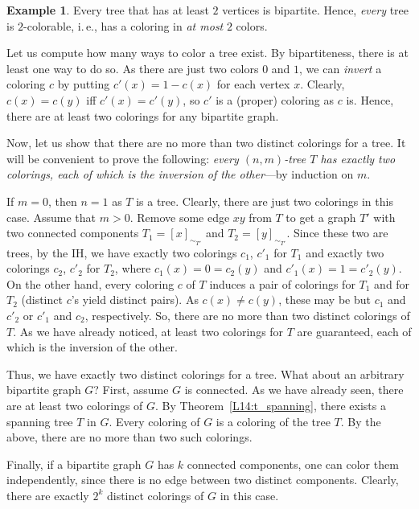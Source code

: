 \documentclass[12pt,notitlepage]{article}
\theoremstyle{plain}
\theoremstyle{definition}
\newtheorem{exm}[thm]{Example}
\theoremstyle{plain}
\newcommand{\1}{\mathbf{1}}
\newcommand{\0}{\mathbf{0}}
\begin{document}
\begin{exm}
Every tree that has at least $2$ vertices is bipartite. Hence, \emph{every} tree is $2$-colorable, i.\,e., has a coloring in \emph{at most} $2$ colors.

Let us compute how many ways to color a tree exist. By bipartiteness, there is at least one way to do so. As there are just two colors $0$ and $1$, we can \emph{invert} a coloring $c$ by putting $c'(x) = 1 - c(x)$ for each vertex $x$. Clearly, $c(x) = c(y)$ iff $c'(x) = c'(y)$, so $c'$ is a (proper) coloring as $c$ is. Hence, there are at least two colorings for any bipartite graph.

Now, let us show that there are no more than two distinct colorings for a tree. It will be convenient to prove the following: \emph{every $(n,m)$-tree $T$ has exactly two colorings, each of which is the inversion of the other}---by induction on $m$.

If $m = 0$, then $n = 1$ as $T$ is a tree. Clearly, there are just two colorings in this case. Assume that $m > 0$. Remove some edge $x y$ from $T$ to get a graph $T'$ with two connected components $T_1 = [x]_{\sim_{T'}}$ and $T_2 = [y]_{\sim_{T'}}$. Since these two are trees, by the IH, we have exactly two colorings $c_1$, $c'_1$ for $T_1$ and exactly two colorings $c_2$, $c'_2$ for $T_2$, where $c_1(x) = 0 = c_2(y)$ and $c'_1(x) = 1 = c'_2(y)$. On the other hand, every coloring $c$ of $T$ induces a pair of colorings for $T_1$ and for $T_2$ (distinct $c$'s yield distinct pairs). As $c(x) \neq c(y)$, these may be but $c_1$ and $c'_2$ or $c'_1$ and $c_2$, respectively. So, there are no more than two distinct colorings of $T$. As we have already noticed, at least two colorings for $T$ are guaranteed, each of which is the inversion of the other.

Thus, we have exactly two distinct colorings for a tree. What about an arbitrary bipartite graph $G$? First, assume $G$ is connected. As we have already seen, there are at least two colorings of $G$. By Theorem~\ref{L14:t_spanning}, there exists a spanning tree $T$ in $G$. Every coloring of $G$ is a coloring of the tree $T$. By the above, there are no more than two such colorings.

Finally, if a bipartite graph $G$ has $k$ connected components, one can color them independently, since there is no edge between two distinct components. Clearly, there are exactly $2^k$ distinct colorings of $G$ in this case.
\end{exm}
\end{document}
